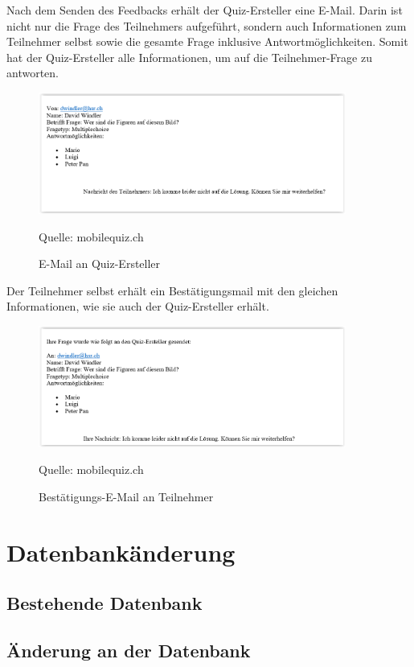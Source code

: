 Nach dem Senden des Feedbacks erhält der Quiz-Ersteller eine E-Mail. Darin ist nicht nur die Frage des Teilnehmers aufgeführt, sondern auch Informationen zum Teilnehmer selbst sowie die gesamte Frage inklusive Antwortmöglichkeiten. Somit hat der Quiz-Ersteller alle Informationen, um auf die Teilnehmer-Frage zu antworten.

\begin{figure}[H]
	\centering
	\includegraphics[width=0.9\textwidth]{Images/Feedback-Mail_Quiz-Ersteller.PNG}
	\caption{E-Mail an Quiz-Ersteller}
	Quelle: mobilequiz.ch
\end{figure}

Der Teilnehmer selbst erhält ein Bestätigungsmail mit den gleichen Informationen, wie sie auch der Quiz-Ersteller erhält.

\begin{figure}[H]
	\centering
	\includegraphics[width=0.9\textwidth]{Images/Feedback-Mail_Teilnehmer.PNG}
	\caption{Bestätigungs-E-Mail an Teilnehmer}
	Quelle: mobilequiz.ch
\end{figure}


\section{Datenbankänderung}
\subsection{Bestehende Datenbank}

\subsection{Änderung an der Datenbank}

